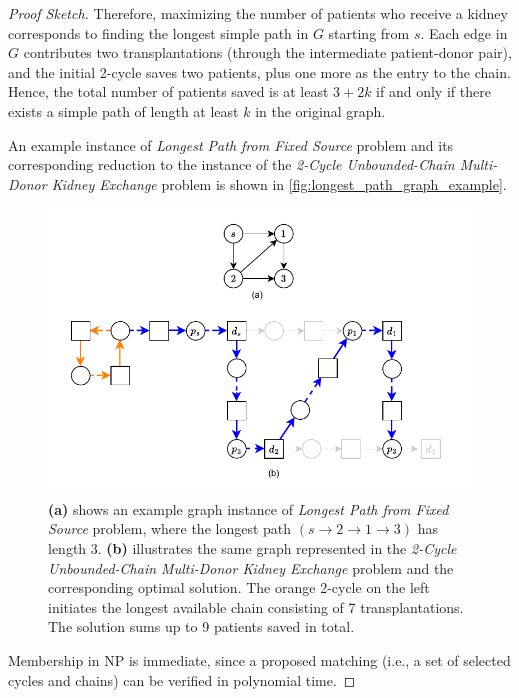 \begin{proof}[Proof Sketch]
Therefore, maximizing the number of patients who receive a kidney corresponds to finding the longest simple path in $G$ starting from $s$. Each edge in $G$ contributes two transplantations (through the intermediate patient-donor pair), and the initial 2-cycle saves two patients, plus one more as the entry to the chain. Hence, the total number of patients saved is at least $3 + 2k$ if and only if there exists a simple path of length at least $k$ in the original graph.

An example instance of \textit{Longest Path from Fixed Source} problem and its corresponding reduction to the instance of the \textit{2-Cycle Unbounded-Chain Multi-Donor Kidney Exchange} problem is shown in \autoref{fig:longest_path_graph_example}.

\begin{figure}
    \centering
    \includegraphics{data/longest_path_graph_example.pdf}
    \caption[An example instance of \textit{Longest Path from Fixed Source} problem and its corresponding reduction to the instance of the \textit{2-Cycle Unbounded-Chain Multi-Donor Kidney Exchange} problem]{\textbf{(a)} shows an example graph instance of \textit{Longest Path from Fixed Source} problem, where the longest path $(s \rightarrow 2 \rightarrow 1 \rightarrow 3)$ has length 3. \textbf{(b)} illustrates the same graph represented in the \textit{2-Cycle Unbounded-Chain Multi-Donor Kidney Exchange} problem and the corresponding optimal solution. The orange 2-cycle on the left initiates the longest available chain consisting of 7 transplantations. The solution sums up to 9 patients saved in total.}
    \label{fig:longest_path_graph_example}
\end{figure}

Membership in NP is immediate, since a proposed matching (i.e., a set of selected cycles and chains) can be verified in polynomial time.
\end{proof}

